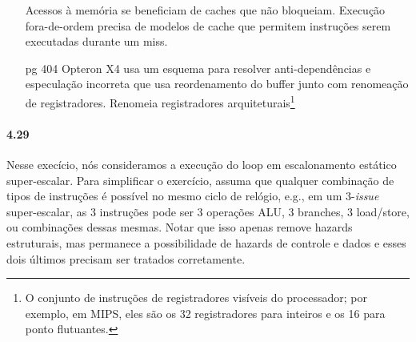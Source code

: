 \documentclass{article}
\begin{document}
\begin{enumerate}
\begin{table}[ht!]
\centering
{}
\caption{Tabela de processadores Intel e Microprocessadores Sun em termos de
complexidade de pipeline, número de cores, e custo energético. Os estágios do
pipeline Pentium 4 não incluem unidade de \textit{commit}. Se incluirmos, o
então pipeline do Pentium 4 será mais profundo.}
\end{table}

Acessos à memória se beneficiam de caches que não bloqueiam. Execução
fora-de-ordem precisa de modelos de cache que permitem instruções serem
executadas durante um miss.

\item[pg 404] Opteron X4 usa um esquema para resolver anti-dependências e 
especulação incorreta que usa reordenamento do buffer junto com renomeação de 
registradores. Renomeia registradores arquiteturais\footnote{O conjunto de 
instruções de registradores visíveis do processador; por exemplo, em MIPS, eles 
são os 32 registradores para inteiros e os 16 para ponto flutuantes.}


\end{enumerate}

\paragraph{4.29} Nesse execício, nós consideramos a execução do loop em 
escalonamento estático super-escalar. Para simplificar o exercício, assuma que 
qualquer combinação de tipos de instruções é possível no mesmo ciclo de 
relógio, e.g., em um 3-\textit{issue} super-escalar, as 3 instruções pode ser 3 
operações ALU, 3 branches, 3 load/store, ou combinações dessas mesmas. Notar 
que isso apenas remove hazards estruturais, mas permanece a possibilidade de 
hazards de controle e dados e esses dois últimos precisam ser tratados 
corretamente.
\end{document}
